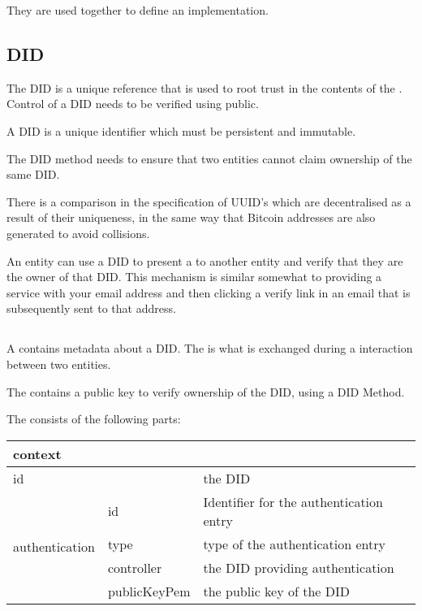\documentclass[10pt,a4paper]{runcrypto}
\begin{document}
They are used together to define an implementation.

\subsection{DID}
The DID is a unique reference that is used to root trust in the contents of the \diddoc.  Control of a DID needs to be verified using public.

A DID is a unique identifier which must be persistent and immutable.

The DID method needs to ensure that two entities cannot claim ownership of the same DID.

There is a comparison in the specification of UUID's which are decentralised as a result of their uniqueness, in the same way that Bitcoin addresses are also generated to avoid collisions.

An entity can use a DID to present a \diddoc to another entity and verify that they are the owner of that DID.  This mechanism is similar somewhat to providing a service with your email address and then clicking a verify link in an email that is subsequently sent to that address.

\subsection{\diddoc}
A \diddoc contains metadata about a DID.  The \diddoc is what is exchanged during a interaction between two entities.

The \diddoc contains a public key to verify ownership of the DID, using a DID Method.

The \diddoc consists of the following parts: 
\begin{center}
	{\renewcommand{\arraystretch}{2}
		\begin{tabular}{ |p{2.5cm}|p{2.5cm}|p{6cm}| }
			\hline
			\multicolumn{2}{|l|}{context} &  \\
			\hline
			\multicolumn{2}{|l|}{id} & the DID \\
			\hline
			\multirow[t]{4}{*}{authentication} & id & Identifier for the authentication entry \\
			\cline{2-3}
			\cline{2-3} & type & type of the authentication entry \\
			\cline{2-3} & controller & the DID providing authentication \\
			\cline{2-3} & publicKeyPem & the public key of the DID \\
			\hline
		\end{tabular}
	}
\end{center}
\end{document}
